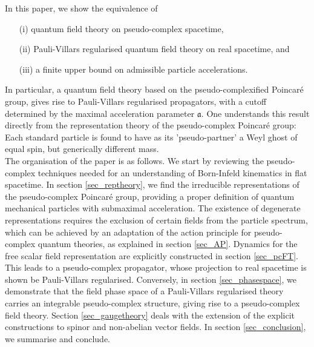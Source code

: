 \documentclass[a4paper,aps,prd,showkeys,showpacs,superscriptaddress,preprint]{revtex4}
\newcommand{\pc}{\mathbb{P}}
\begin{document}
\noindent In this paper, we show the equivalence of
\begin{itemize}
  \item[(i)] quantum field theory on pseudo-complex
spacetime,
  \item[(ii)] Pauli-Villars regularised quantum field
theory on real spacetime, and
  \item[(iii)] a finite upper bound on
admissible particle accelerations.
\end{itemize}
In particular, a quantum field theory based on the
pseudo-complexified Poincar\'e group, gives rise to Pauli-Villars
regularised propagators, with a cutoff determined
by the maximal acceleration parameter $\mathfrak{a}$. One understands
this result directly from the representation theory of the pseudo-complex
Poincar\'e group: Each standard particle is found to have as its
'pseudo-partner' a Weyl ghost of equal spin, but generically different
mass.\\
 



The organisation of the paper is as follows. We start by reviewing the
pseudo-complex techniques needed for an understanding of Born-Infeld
kinematics in flat spacetime. In section \ref{sec_reptheory}, we find
the irreducible representations of the
pseudo-complex Poincar\'e group, providing a proper definition of
quantum mechanical particles with submaximal
acceleration. The existence of degenerate representations requires the
exclusion of certain fields from the particle spectrum,
which can be achieved by an adaptation of the action principle for
pseudo-complex quantum theories, as explained in section \ref{sec_AP}. 
Dynamics for
the free scalar field representation are explicitly constructed in section
\ref{sec_pcFT}. This leads to a 
pseudo-complex propagator, whose projection to real spacetime is shown
be Pauli-Villars regularised. 
Conversely, in section \ref{sec_phasespace}, we demonstrate that the
field phase space of a Pauli-Villars regularised theory
carries an integrable 
pseudo-complex structure, giving rise to a pseudo-complex field theory.
Section \ref{sec_gaugetheory} deals with the extension of the explicit
constructions to spinor and non-abelian vector fields. In section
\ref{sec_conclusion}, we summarise and conclude.
\end{document}
